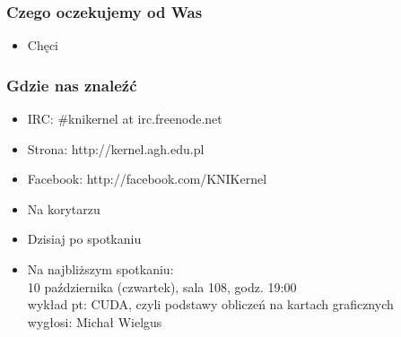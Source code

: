 \documentclass[12pt]{beamer}
\begin{document}
\begin{frame}
	\frametitle{Czego oczekujemy od Was}
	\begin{itemize}
		\item<2->Chęci
	\end{itemize}
\end{frame}
\begin{frame}
	\frametitle{Gdzie nas znaleźć}
	\begin{itemize}
		\item<2->IRC: \#knikernel at irc.freenode.net
		\item<3->Strona: http://kernel.agh.edu.pl
		\item<4->Facebook: http://facebook.com/KNIKernel
		\item<5->Na korytarzu
		\item<6->Dzisiaj po spotkaniu
		\item<7->Na najbliższym spotkaniu:\\
		10 października (czwartek), sala 108, godz. 19:00\\
		wykład pt: CUDA, czyli podstawy obliczeń na kartach graficznych\\
		wygłosi: Michał Wielgus
	\end{itemize}
\end{frame}
\end{document}
